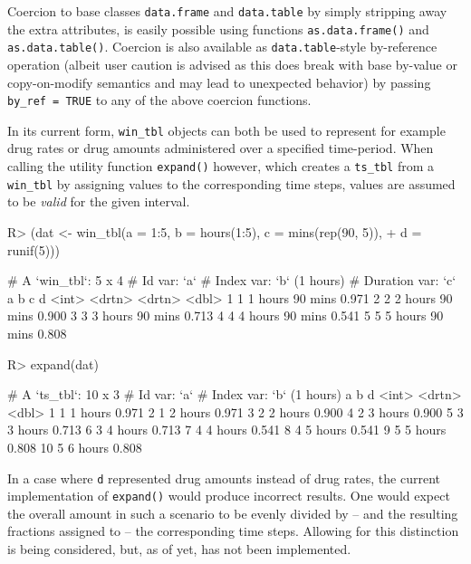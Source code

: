 \documentclass[
  notitle]{jss}
\begin{document}
Coercion to base classes \texttt{data.frame} and \texttt{data.table} by
simply stripping away the extra attributes, is easily possible using
functions \texttt{as.data.frame()} and \texttt{as.data.table()}.
Coercion is also available as \texttt{data.table}-style by-reference
operation (albeit user caution is advised as this does break with base
 by-value or copy-on-modify semantics and may lead to
unexpected behavior) by passing \texttt{by\_ref\ =\ TRUE} to any of the
above coercion functions.

In its current form, \texttt{win\_tbl} objects can both be used to
represent for example drug rates or drug amounts administered over a
specified time-period. When calling the utility function
\texttt{expand()} however, which creates a \texttt{ts\_tbl} from a
\texttt{win\_tbl} by assigning values to the corresponding time steps,
values are assumed to be \emph{valid} for the given interval.

\begin{CodeChunk}
\begin{CodeInput}
R> (dat <- win_tbl(a = 1:5, b = hours(1:5), c = mins(rep(90, 5)),
+                 d = runif(5)))
\end{CodeInput}
\begin{CodeOutput}
# A `win_tbl`:  5 x 4
# Id var:       `a`
# Index var:    `b` (1 hours)
# Duration var: `c`
      a b       c           d
  <int> <drtn>  <drtn>  <dbl>
1     1 1 hours 90 mins 0.971
2     2 2 hours 90 mins 0.900
3     3 3 hours 90 mins 0.713
4     4 4 hours 90 mins 0.541
5     5 5 hours 90 mins 0.808
\end{CodeOutput}
\begin{CodeInput}
R> expand(dat)
\end{CodeInput}
\begin{CodeOutput}
# A `ts_tbl`: 10 x 3
# Id var:     `a`
# Index var:  `b` (1 hours)
       a b           d
   <int> <drtn>  <dbl>
 1     1 1 hours 0.971
 2     1 2 hours 0.971
 3     2 2 hours 0.900
 4     2 3 hours 0.900
 5     3 3 hours 0.713
 6     3 4 hours 0.713
 7     4 4 hours 0.541
 8     4 5 hours 0.541
 9     5 5 hours 0.808
10     5 6 hours 0.808
\end{CodeOutput}
\end{CodeChunk}

In a case where \texttt{d} represented drug amounts instead of drug
rates, the current implementation of \texttt{expand()} would produce
incorrect results. One would expect the overall amount in such a
scenario to be evenly divided by -- and the resulting fractions assigned
to -- the corresponding time steps. Allowing for this distinction is
being considered, but, as of yet, has not been implemented.
\end{document}
